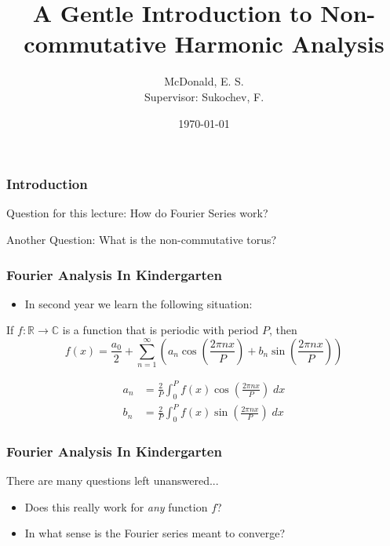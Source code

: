 \documentclass{beamer}
\title[Harmonic Analysis]{A Gentle Introduction to Non-commutative Harmonic Analysis}
\author[McDonald, E.]{McDonald, E. S. \\Supervisor: Sukochev, F.}
\institute[UNSW] { UNSW Australia }
\date{\today}
\newcommand{\Rl}{\mathbb{R}}
\newcommand{\Cplx}{\mathbb{C}}
\begin{document}
\begin{frame}
\titlepage
\end{frame} %
\begin{frame}
\frametitle{Introduction}
    \begin{block}
            {Question for this lecture:}
                How do Fourier Series work?
        \end{block}
    \begin{block}
            {Another Question:}
                What is the non-commutative torus?
    \end{block}
\end{frame}

\begin{frame}
    \frametitle{Fourier Analysis In Kindergarten}
    \begin{itemize}
        \item{} In second year we learn the following situation:
    \end{itemize}
    \begin{definition}
        If $f:\Rl\rightarrow\Cplx$ is a function that is periodic with period $P$, then
        \begin{equation*}
            f(x) = \frac{a_0}{2}+\sum_{n=1}^\infty \left(a_n \cos\left(\frac{2\pi n x}{P}\right)+b_n\sin\left(\frac{2\pi n x}{P}\right)\right)
        \end{equation*}
    \end{definition}
    \begin{definition}
        \begin{align*}
            a_n &= \frac{2}{P}\int_{0}^P f(x) \cos\left(\frac{2\pi n x}{P}\right)\;dx\\
            b_n &= \frac{2}{P}\int_{0}^P f(x) \sin\left(\frac{2\pi n x}{P}\right)\;dx
        \end{align*}
    \end{definition}
\end{frame}

\begin{frame}
    \frametitle{Fourier Analysis In Kindergarten}
        There are many questions left unanswered...
        \begin{itemize}
            \item{} Does this really work for \emph{any} function $f$?
            \item{} In what sense is the Fourier series meant to converge?
        \end{itemize}
\end{frame}
\end{document}
